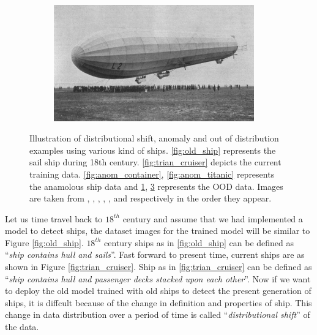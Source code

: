 \begin{figure}[h!]
\begin{subfigure}{0.333\textwidth}
        \caption{}
        \label{fig:ood_submarine}
    \end{subfigure}
    \begin{subfigure}{0.333\textwidth}
        \centering
        \includegraphics[height=0.15\textheight,width=0.95\textwidth]{images/intro_ood_anomaly/ood_airship.jpg}
        \caption{}
        \label{fig:ood_airship}
    \end{subfigure}
    \caption{Illustration of distributional shift, anomaly and out of distribution examples using various kind of ships. \ref{fig:old_ship} represents the sail ship during 18th century. \ref{fig:trian_cruiser} depicts the current training data.
    \ref{fig:anom_container}, \ref{fig:anom_titanic} represents the anamolous ship data and \ref{fig:ood_submarine}, \ref{fig:ood_airship} represents the OOD data. Images are taken from \cite{old_ship}, \cite{train_cruiser}, \cite{container},
    \cite{titanic}, \cite{submarine}, and \cite{airship} respectively in the order they appear.}
\end{figure}

Let us time travel back to $18^{th}$ century and assume that we had implemented a model to detect ships, the dataset images for the trained model will be similar to Figure \ref{fig:old_ship}.
$18^{th}$ century ships as in \ref{fig:old_ship} can be defined as ``\textit{ship contains hull and sails}''.
Fast forward to present time, current ships are as shown in Figure \ref{fig:trian_cruiser}.
Ship as in \ref{fig:trian_cruiser} can be defined as ``\textit{ship contains hull and passenger decks stacked upon each other}''.
Now if we want to deploy the old model trained with old ships to detect the present generation of ships, it is diffcult because of the change in definition and properties of ship. 
This change in data distribution over a period of time is called ``\textit{distributional shift}'' of the data.

